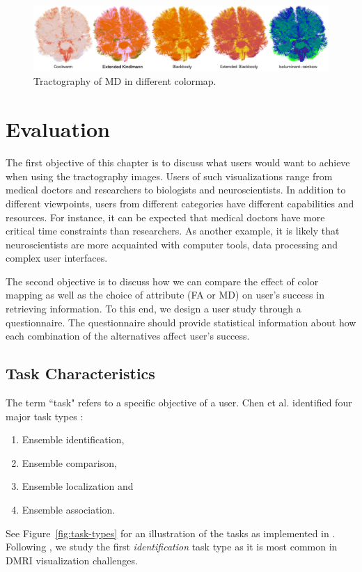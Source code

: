 \documentclass[hyperref, plainreport, noproblem]{cgvpub1}
\begin{document}
\begin{figure}[ht]
    \centering
    \includegraphics[width = 0.9\columnwidth]{8}
    \caption{Tractography of MD in different colormap.}
    \label{fig:8}
\end{figure}

\chapter{Evaluation}

The first objective of this chapter is to discuss what users would want to achieve when using the tractography images. Users of such visualizations range from medical doctors and researchers to biologists and neuroscientists. In addition to different viewpoints, users from different categories have different capabilities and resources. For instance, it can be expected that medical doctors have more critical time constraints than researchers. As another example, it is likely that neuroscientists are more acquainted with computer tools, data processing and complex user interfaces.

The second objective is to discuss how we can compare the effect of color mapping as well as the choice of attribute (FA or MD) on user's success in retrieving information. To this end, we design a user study through a questionnaire. The questionnaire should provide statistical information about how each combination of the alternatives affect user's success. 

\section{Task Characteristics}

The term ``task" refers to a specific objective of a user. Chen et al. \cite{chen} identified four major task types : 
\begin{enumerate}
	\item Ensemble identification, 
	\item Ensemble comparison, 
	\item Ensemble localization and
	\item Ensemble association.
\end{enumerate}
See Figure~\ref{fig:task-types} for an illustration of the tasks as implemented in \cite{chen}. Following \cite{chen}, we study the first \emph{identification} task type as it is most common in DMRI visualization challenges. 
\end{document}
